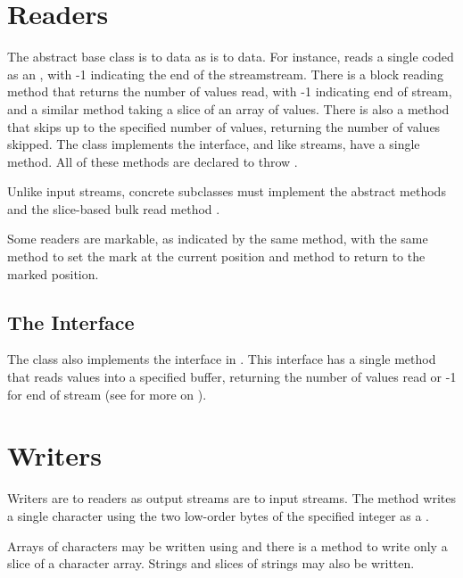 \section{Readers}

The  abstract base class is to  data as
 is to  data.  For instance,
 reads a single  coded as an , with
-1 indicating the end of the streamstream.  There is a block reading
method  that returns the number of values read,
with -1 indicating end of stream, and a similar method taking a slice
of an array of  values.  There is also a 
method that skips up to the specified number of  values,
returning the number of values skipped.  The  class
implements the  interface, and like streams, have a
single  method.  All of these methods are declared to
throw .

Unlike input streams, concrete subclasses must implement the abstract
methods  and the slice-based bulk read method
.

Some readers are markable, as indicated by the same
 method, with the same  method to
set the mark at the current position and  method to
return to the marked position.

\subsection{The  Interface}

The  class also implements the  interface
in .  This interface has a single method
 that reads  values into a specified
buffer, returning the number of values read or -1 for end of stream
(see  for more on ).


\section{Writers}

Writers are to readers as output streams are to input streams.  The
method  writes a single character using the two
low-order bytes of the specified integer as a .

Arrays of characters may be written using  and
there is a method to write only a slice of a character array.  Strings
and slices of strings may also be written.  

